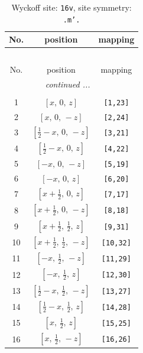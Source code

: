 \documentclass[fleqn,8pt]{jsarticle}
\begin{document}
\renewcommand{\arraystretch}{1.2}
\begin{longtable}{ccc}
\caption{Wyckoff site: {\tt 16v}, site symmetry: {\tt .m'.}}
 \\
 \hline \hline
No. & position & mapping \\ \hline \endfirsthead

\multicolumn{2}{l}{\tablename\ \thetable{}} \\
 \hline \hline
No. & position & mapping \\ \hline \endhead

 \hline \hline
\multicolumn{2}{r}{\footnotesize\it continued ...} \\ \endfoot

 \hline \hline
\multicolumn{2}{r}{} \\ \endlastfoot

1 & $\left[ x,\, 0,\, z \right]$ & {\tt [1,23]} \\ \hline
2 & $\left[ x,\, 0,\, - z \right]$ & {\tt [2,24]} \\ \hline
3 & $\left[ \frac{1}{2} - x,\, 0,\, - z \right]$ & {\tt [3,21]} \\ \hline
4 & $\left[ \frac{1}{2} - x,\, 0,\, z \right]$ & {\tt [4,22]} \\ \hline
5 & $\left[ - x,\, 0,\, - z \right]$ & {\tt [5,19]} \\ \hline
6 & $\left[ - x,\, 0,\, z \right]$ & {\tt [6,20]} \\ \hline
7 & $\left[ x + \frac{1}{2},\, 0,\, z \right]$ & {\tt [7,17]} \\ \hline
8 & $\left[ x + \frac{1}{2},\, 0,\, - z \right]$ & {\tt [8,18]} \\ \hline
9 & $\left[ x + \frac{1}{2},\, \frac{1}{2},\, z \right]$ & {\tt [9,31]} \\ \hline
10 & $\left[ x + \frac{1}{2},\, \frac{1}{2},\, - z \right]$ & {\tt [10,32]} \\ \hline
11 & $\left[ - x,\, \frac{1}{2},\, - z \right]$ & {\tt [11,29]} \\ \hline
12 & $\left[ - x,\, \frac{1}{2},\, z \right]$ & {\tt [12,30]} \\ \hline
13 & $\left[ \frac{1}{2} - x,\, \frac{1}{2},\, - z \right]$ & {\tt [13,27]} \\ \hline
14 & $\left[ \frac{1}{2} - x,\, \frac{1}{2},\, z \right]$ & {\tt [14,28]} \\ \hline
15 & $\left[ x,\, \frac{1}{2},\, z \right]$ & {\tt [15,25]} \\ \hline
16 & $\left[ x,\, \frac{1}{2},\, - z \right]$ & {\tt [16,26]} \\
\end{longtable}
\end{document}
